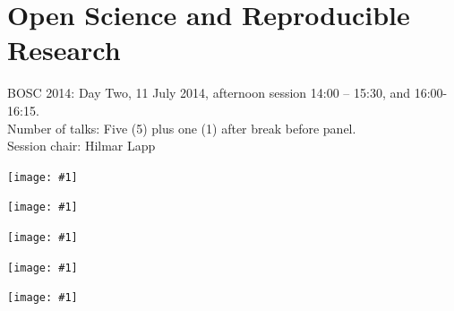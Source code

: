 \documentclass[10pt,oneside]{article}
\newcommand{\embed}[1]{\begin{center}\texttt{[image: \#1]}\end{center}}
\begin{document}
\newpage
\section*{Open Science and Reproducible Research }
BOSC 2014: Day Two, 11 July 2014, afternoon session 14:00 -- 15:30, and 16:00-16:15. \\
\noindent Number of talks: Five (5) plus one (1) after break before panel. \\
\noindent Session chair: Hilmar Lapp
\embed{OpenScience-11-SEEK.pdf}
\embed{OpenScience-31-Arvados.pdf}
\embed{OpenScience-35-Galaxy-community.pdf}
\embed{OpenScience-23-Community-Pipelines.pdf}
\embed{OpenScience-26-Open-Tree-of-Life.pdf}
\end{document}
